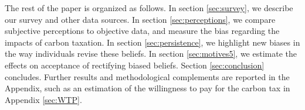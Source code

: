 \documentclass[12pt]{article} %
\begin{document}
The rest of the paper is organized as follows. In section \ref{sec:survey}, we describe our survey and other data sources. In section \ref{sec:perceptions}, we compare subjective perceptions to objective data, and measure the bias regarding the impacts of carbon taxation. In section \ref{sec:persistence}, we highlight new biases in the way individuals revise these beliefs. In section \ref{sec:motives5}, we estimate the effects on acceptance of rectifying biased beliefs. Section \ref{sec:conclusion} concludes. Further results and methodological complements are reported in the Appendix, such as an estimation of the willingness to pay for the carbon tax in Appendix \ref{sec:WTP}.


\end{document}
